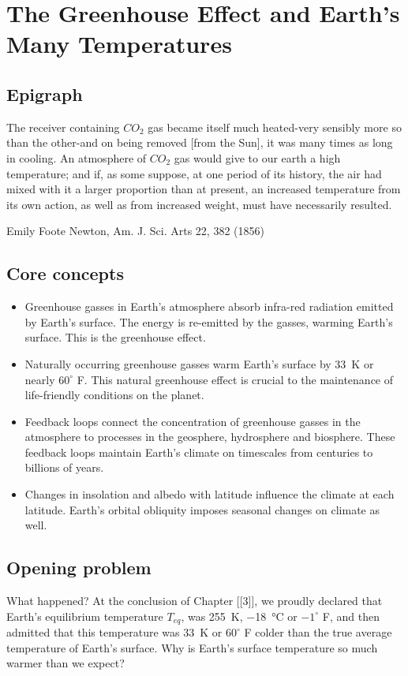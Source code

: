 \chapter{The Greenhouse Effect and Earth's Many Temperatures}\label{The Greenhouse Effect}
\section{Epigraph} \label{Greenhouse_Epigraph}
\epigraph{The receiver containing $CO_2$ gas became itself much heated-very sensibly more so than the other-and on being removed [from the Sun], it was many times as long in cooling. An atmosphere of $CO_2$ gas would give to our earth a high temperature; and if, as some suppose, at one period of its history, the air had mixed with it a larger proportion than at present, an increased temperature from its own action, as well as from increased weight, must have necessarily resulted.}{Emily Foote Newton, Am. J. Sci. Arts 22, 382 (1856)} 


\section{Core concepts} \label{Greenhouse_Core Concepts}
\begin{itemize}
\item Greenhouse gasses in Earth's atmosphere absorb infra-red radiation emitted by Earth's surface. The energy is re-emitted by the gasses, warming Earth's surface. This is the greenhouse effect.
\item Naturally occurring greenhouse gasses warm Earth's surface by \SI{33}{\kelvin} or nearly ${60}^{\circ}$ F. This natural greenhouse effect is crucial to the maintenance of life-friendly conditions on the planet.
\item Feedback loops connect the concentration of greenhouse gasses in the atmosphere to processes in the geosphere, hydrosphere and biosphere. These feedback loops maintain Earth's climate on timescales from centuries to billions of years.
\item Changes in insolation and albedo with latitude influence the climate at each latitude. Earth's orbital obliquity imposes seasonal changes on climate as well. 
\end{itemize}

\section{Opening problem} \label{Earths many temperatures}
What happened? At the conclusion of Chapter [[3]], we proudly declared that Earth's equilibrium temperature $T_{eq}$, was \SI{255}{\kelvin}, \SI{-18}{\celsius} or ${-1}^{\circ}$ F, and then admitted that this temperature was \SI{33}{\kelvin} or ${60}^{\circ}$ F colder than the true average temperature of Earth's surface. Why is Earth's surface temperature so much warmer than we expect?

